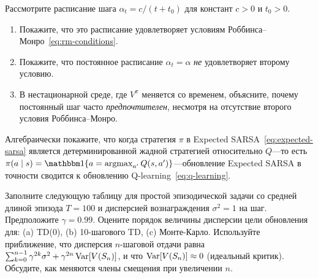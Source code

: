 \begin{exercise}
\label{ex:rm-conditions}
Рассмотрите расписание шага $\alpha_t = c/(t+t_0)$ для констант $c>0$ и $t_0>0$.
\begin{enumerate}[label=(\alph*)]
  \item Покажите, что это расписание удовлетворяет условиям Роббинса--Монро~\eqref{eq:rm-conditions}.
  \item Покажите, что постоянное расписание $\alpha_t = \alpha$ \emph{не} удовлетворяет второму условию.
  \item В нестационарной среде, где $V^\pi$ меняется со временем, объясните, почему постоянный шаг часто \emph{предпочтителен}, несмотря на отсутствие второго условия Роббинса--Монро.
\end{enumerate}
\end{exercise}

\begin{exercise}
\label{ex:expected-sarsa-reduce}
Алгебраически покажите, что когда стратегия $\pi$ в Expected SARSA~\eqref{eq:expected-sarsa} является детерминированной жадной стратегией относительно $Q$---то есть $\pi(a\mid s) = \ind\{a = \argmax_{a'}Q(s,a')\}$---обновление Expected SARSA в точности сводится к обновлению Q-learning~\eqref{eq:q-learning}.
\end{exercise}

\begin{exercise}
\label{ex:bias-variance-table}
Заполните следующую таблицу для простой эпизодической задачи со средней длиной эпизода $T=100$ и дисперсией вознаграждения $\sigma^2=1$ на шаг.  Предположите $\gamma=0.99$.  Оцените порядок величины дисперсии цели обновления для: (a) TD(0), (b) 10-шагового TD, (c) Монте-Карло.  Используйте приближение, что дисперсия $n$-шаговой отдачи равна $\sum_{k=0}^{n-1}\gamma^{2k}\sigma^2 + \gamma^{2n}\operatorname{Var}[V(S_n)]$, и что $\operatorname{Var}[V(S_n)]\approx 0$ (идеальный критик).  Обсудите, как меняются члены смещения при увеличении $n$.
\end{exercise}
